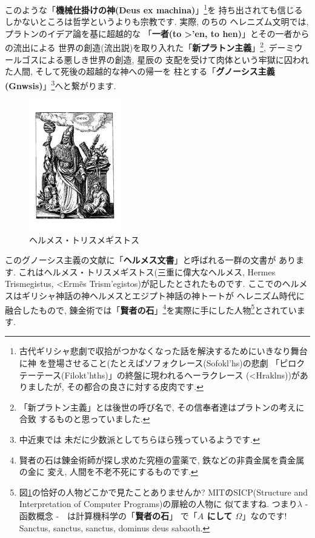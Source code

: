 このような「\textbf{機械仕掛けの神(Deus ex machina)}」\footnote{
古代ギリシャ悲劇で収拾がつかなくなった話を解決するためにいきなり舞台に神
を登場させること(たとえばソフォクレース(\textgreek{Sofokl'hs})の悲劇
「ピロクテーテース(\textgreek{Filokt'hths})」の終盤に現われるヘーラクレース
(\textgreek{<Hraklns}))がありましたが, その都合の良さに対する皮肉です.}を
持ち出されても信じるしかないところは哲学というよりも宗教です. 実際, のちの
ヘレニズム文明では, プラトンのイデア論を基に超越的な
「\textbf{一者(\textgreek{to >'en}, to hen)}」とその一者からの流出による
世界の創造(流出説)を取り入れた「\textbf{新プラトン主義}」\footnote{
「新プラトン主義」とは後世の呼び名で, その信奉者達はプラトンの考えに合致
するものと思っていました.}, デーミウールゴスによる悪しき世界の創造, 星辰の
支配を受けて肉体という牢獄に囚われた人間, そして死後の超越的な神への帰一を
柱とする「\textbf{グノーシス主義(\textgreek{Gnwsis})}」\footnote{中近東では
未だに少数派としてちらほら残っているようです.}へと繋がります.
\newline


\begin{figure}
\includegraphics[width=4cm]{HermesTrismegistusCauc.pdf}
\caption{ヘルメス・トリスメギストス}
\label{fig:trismegistus}
\end{figure}

このグノーシス主義の文献に「\textbf{ヘルメス文書}」と呼ばれる一群の文書が
あります. これはヘルメス・トリスメギストス(三重に偉大なヘルメス, Hermes
 Trismegistus, \textgreek{<Erm\~es Trism'egistos})が記したとされたものです.
 ここでのヘルメスはギリシャ神話の神ヘルメスとエジプト神話の神トートが
ヘレニズム時代に融合したもので, 錬金術では「\textbf{賢者の石}」\footnote{
賢者の石は錬金術師が探し求めた究極の霊薬で, 鉄などの非貴金属を貴金属の金に
変え, 人間を不老不死にするものです.}を実際に手にした人物\footnote{
図\ref{fig:trismegistus}の恰好の人物どこかで見たことありませんか?
 MITのSICP(Structure and Interpretation of Computer Programs)の扉絵の人物に
似てますね. つまり$\lambda$ - 函数概念 -　は計算機科学の「\textbf{賢者の石}」
で「\textbf{$A$ にして $\Omega$}」なのです!
Sanctus, sanctus, sanctus, dominus deus sabaoth.}とされています\cite{錬金術}.
\newline 


